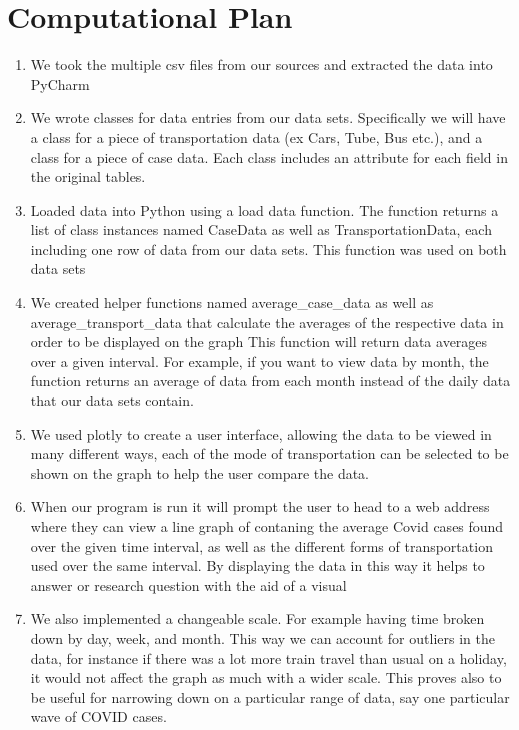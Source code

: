 \documentclass[fontsize=11pt]{article}
\begin{document}
\section*{Computational Plan}

\begin{enumerate}
    \item We took the multiple csv files from our sources and extracted the data into PyCharm
    \item We wrote classes for data entries from our data sets. Specifically we will have a class for a piece of transportation data (ex Cars, Tube, Bus etc.), and a class for a piece of case data. Each class includes an attribute for each field in the original tables.
    \item Loaded data into Python using a load data function. The function returns a list of class instances named CaseData as well as TransportationData, each including one row of data from our data sets. This function was used on both data sets
    \item We created helper functions named average\_case\_data as well as average\_transport\_data that calculate the averages of the respective data in order to be displayed on the graph This function will return data averages over a given interval. For example, if you want to view data by month, the function returns an average of data from each month instead of the daily data that our data sets contain.
    \item We used plotly to create a user interface, allowing the data to be viewed in many different ways, each of the mode of transportation can be selected to be shown on the graph to help the user compare the data.
    \item When our program is run it will prompt the user to head to a web address where they can view a line graph of contaning the average Covid cases found over the given time interval, as well as the different forms of transportation used over the same interval. By displaying the data in this way it helps to answer or research question with the aid of a visual
    \item We also implemented a changeable scale. For example having time broken down by day, week, and month. This way we can account for outliers in the data, for instance if there was a lot more train travel than usual on a holiday, it would not affect the graph as much with a wider scale. This proves also to be useful for narrowing down on a particular range of data, say one particular wave of COVID cases.
\end{enumerate}
\end{document}

